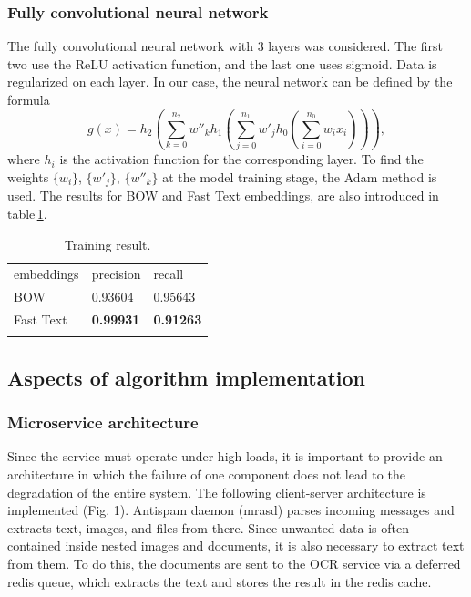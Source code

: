 \documentclass[12pt]{jpconf}
\begin{document}
\subsubsection{Fully convolutional neural network}
The fully convolutional neural network with 3 layers was considered. The first two use the \textsf{ReLU} activation function, and the last one uses \textsf{sigmoid}. Data is regularized on each layer. In our case, the neural network can be defined by the formula
$$
g(x) = h_2 \left(\sum_{k=0}^{n_2} w''_k h_1\left(\sum_{j=0}^{n_1} w'_j h_0\left( \sum_{i=0}^{n_0} w_i x_i \right)\right)\right),
$$
where $h_i$ is the activation function for the corresponding layer. To find the weights $\{w_i\}$, $\{w'_j\}$, $\{w''_k\}$ at the model training stage, the Adam method is used.
The results for BOW and Fast Text embeddings, are also introduced in table\,\ref{tbl:02}.
\begin{table}
	\centering
	\caption{\label{tbl:02}Training result.}
	\begin{center}
	\begin{tabular}{lll}
		\br
		embeddings & precision & recall \\
		\mr
		BOW & 0.93604 & 0.95643 \\ \hline
		Fast Text & \bf 0.99931 & \bf 0.91263 \\ 
		\br
	\end{tabular}
	\end{center}
\end{table}

\subsection{Aspects of algorithm implementation}
\subsubsection{Microservice architecture}
Since the service must operate under high loads, it is important to provide an architecture in which the failure of one component does not lead to the degradation of the entire system. The following client-server architecture is implemented (Fig. 1). Antispam daemon (mrasd) parses incoming messages and extracts text, images, and files from there. Since unwanted data is often contained inside nested images and documents, it is also necessary to extract text from them. To do this, the documents are sent to the OCR service via a deferred redis queue, which extracts the text and stores the result in the redis cache.
\end{document}
